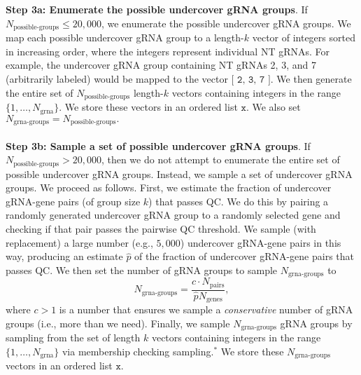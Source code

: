 \documentclass[12pt]{article}
\begin{document}
\\ \\
\textbf{Step 3a: Enumerate the possible undercover gRNA groups}. If $N_\textrm{possible-groups} \leq 20,000$, we enumerate the possible undercover gRNA groups. We map each possible undercover gRNA group to a length-$k$ vector of integers sorted in increasing order, where the integers represent individual NT gRNAs. For example, the undercover gRNA group containing NT gRNAs 2, 3, and 7 (arbitrarily labeled) would be mapped to the vector $\texttt{[ 2, 3, 7 ]}.$ We then generate the entire set of $N_\textrm{possible-groups}$ length-$k$ vectors containing integers in the range $\{1, \dots, N_\textrm{grna}\}$. We store these vectors in an ordered list $\texttt{x}$. We also set $N_\textrm{grna-groups} = N_\textrm{possible-groups}.$
\\ \\
\textbf{Step 3b: Sample a set of possible undercover gRNA groups}. If $N_\textrm{possible-groups} > 20,000$, then we do not attempt to enumerate the entire set of possible undercover gRNA groups. Instead, we sample a set of undercover gRNA groups. We proceed as follows. First, we estimate the fraction of undercover gRNA-gene pairs (of group size $k$) that passes QC. We do this by pairing a randomly generated undercover gRNA group to a randomly selected gene and checking if that pair passes the pairwise QC threshold. We sample (with replacement) a large number (e.g., $5,000$) undercover gRNA-gene pairs in this way, producing an estimate $\hat{p}$ of the fraction of undercover gRNA-gene pairs that passes QC. We then set the number of gRNA groups to sample $N_\textrm{grna-groups}$ to $$N_\textrm{grna-groups} = \frac{c \cdot N_\textrm{pairs} }{ \hat{p} N_\textrm{genes}},$$ where $c > 1$ is a number that ensures we sample a \textit{conservative} number of gRNA groups (i.e., more than we need). Finally, we sample $N_\textrm{grna-groups}$ gRNA groups by sampling from the set of length $k$ vectors containing integers in the range $\{1, \dots, N_\textrm{grna}\}$ via membership checking sampling.$^*$ We store these $N_\textrm{grna-groups}$ vectors in an ordered list $\texttt{x}$.
\end{document}
